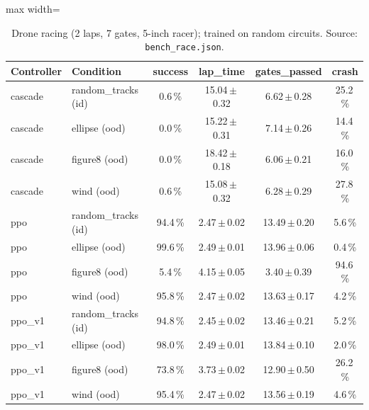 \begin{table}[!htbp]\centering\small\caption{Drone racing (2 laps, 7 gates, 5-inch racer); trained on random circuits. Source: \texttt{bench\_race.json}.}\label{tab:fw_race}
\begin{adjustbox}{max width=\linewidth}\begin{tabular}{llcccc}\toprule
Controller & Condition & success & lap\_time & gates\_passed & crash\\\midrule
cascade & random\_tracks (id) & 0.6\,\% & 15.04\,$\pm$\,0.32 & 6.62\,$\pm$\,0.28 & 25.2\,\%\\
cascade & ellipse (ood) & 0.0\,\% & 15.22\,$\pm$\,0.31 & 7.14\,$\pm$\,0.26 & 14.4\,\%\\
cascade & figure8 (ood) & 0.0\,\% & 18.42\,$\pm$\,0.18 & 6.06\,$\pm$\,0.21 & 16.0\,\%\\
cascade & wind (ood) & 0.6\,\% & 15.08\,$\pm$\,0.32 & 6.28\,$\pm$\,0.29 & 27.8\,\%\\
ppo & random\_tracks (id) & 94.4\,\% & 2.47\,$\pm$\,0.02 & 13.49\,$\pm$\,0.20 & 5.6\,\%\\
ppo & ellipse (ood) & 99.6\,\% & 2.49\,$\pm$\,0.01 & 13.96\,$\pm$\,0.06 & 0.4\,\%\\
ppo & figure8 (ood) & 5.4\,\% & 4.15\,$\pm$\,0.05 & 3.40\,$\pm$\,0.39 & 94.6\,\%\\
ppo & wind (ood) & 95.8\,\% & 2.47\,$\pm$\,0.02 & 13.63\,$\pm$\,0.17 & 4.2\,\%\\
ppo\_v1 & random\_tracks (id) & 94.8\,\% & 2.45\,$\pm$\,0.02 & 13.46\,$\pm$\,0.21 & 5.2\,\%\\
ppo\_v1 & ellipse (ood) & 98.0\,\% & 2.49\,$\pm$\,0.01 & 13.84\,$\pm$\,0.10 & 2.0\,\%\\
ppo\_v1 & figure8 (ood) & 73.8\,\% & 3.73\,$\pm$\,0.02 & 12.90\,$\pm$\,0.50 & 26.2\,\%\\
ppo\_v1 & wind (ood) & 95.4\,\% & 2.47\,$\pm$\,0.02 & 13.56\,$\pm$\,0.19 & 4.6\,\%\\
\bottomrule\end{tabular}\end{adjustbox}
\end{table}

